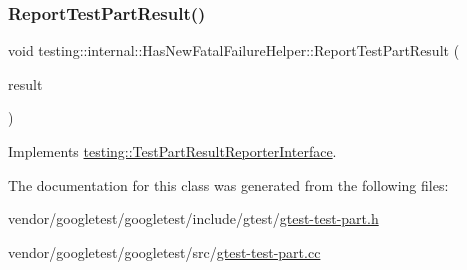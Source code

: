 \mbox{\label{classtesting_1_1internal_1_1_has_new_fatal_failure_helper_a2d2e1faa1f3669b82810df97ac678a27}} 
\subsubsection{\texorpdfstring{Report\+Test\+Part\+Result()}{ReportTestPartResult()}}
{\footnotesize\ttfamily void testing\+::internal\+::\+Has\+New\+Fatal\+Failure\+Helper\+::\+Report\+Test\+Part\+Result (\begin{DoxyParamCaption}\item[{const \hyperlink{classtesting_1_1_test_part_result}{Test\+Part\+Result} \&}]{result }\end{DoxyParamCaption})\hspace{0.3cm}{\ttfamily [virtual]}}



Implements \hyperlink{classtesting_1_1_test_part_result_reporter_interface_aa2f920e7a5a0a6d0faf19e3727928c22}{testing\+::\+Test\+Part\+Result\+Reporter\+Interface}.



The documentation for this class was generated from the following files\+:\begin{DoxyCompactItemize}
\item 
vendor/googletest/googletest/include/gtest/\hyperlink{gtest-test-part_8h}{gtest-\/test-\/part.\+h}\item 
vendor/googletest/googletest/src/\hyperlink{gtest-test-part_8cc}{gtest-\/test-\/part.\+cc}\end{DoxyCompactItemize}
